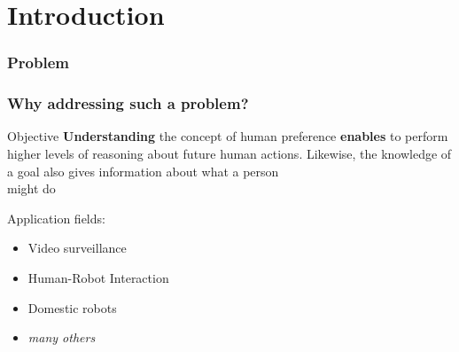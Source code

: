 \section{Introduction}

\begin{frame}
	\frametitle{Problem}
	
	\begin{center}
	\end{center}
\end{frame}

\begin{frame}
	\frametitle{Why addressing such a problem?}
	
	\vspace{0.4cm}
	
	\large
	
	\begin{block}{Objective}
		\textbf{Understanding} the concept of human preference \textbf{enables} to perform
		higher levels of reasoning about future human actions. Likewise, the knowledge of a
		goal also gives information about what a person\\ might do
	\end{block}
	
	\vspace{0.3cm}
	
	Application fields:
	
	\begin{itemize}
		\item Video surveillance
		\item Human-Robot Interaction
		\item Domestic robots
		\item \emph{many others}
	\end{itemize}
\end{frame}

